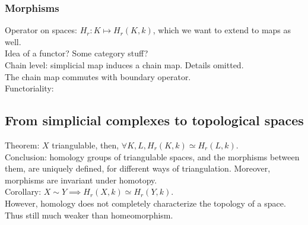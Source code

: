 \documentclass[10pt,a4paper]{article}
\begin{document}
\subsubsection{Morphisms}
Operator on spaces: $H_r:K\mapsto H_r(K,k)$, which we want to extend to maps as well.\\
Idea of a functor? Some category stuff?\\
Chain level: simplicial map induces a chain map. Details omitted.\\
The chain map commutes with boundary operator.\\
Functoriality:\\
\subsection{From simplicial complexes to topological spaces}
Theorem: $X$ triangulable, then, $\forall K,L,H_r(K,k)\simeq H_r(L,k)$.\\
Conclusion: homology groups of triangulable spaces, and the morphisms between them, are uniquely defined, for different ways of triangulation. Moreover, morphisms are invariant under homotopy.\\
Corollary: $X\sim Y\implies H_r(X,k)\simeq H_r(Y,k)$.\\
However, homology does not completely characterize the topology of a space. Thus still much weaker than homeomorphism.
\end{document}
